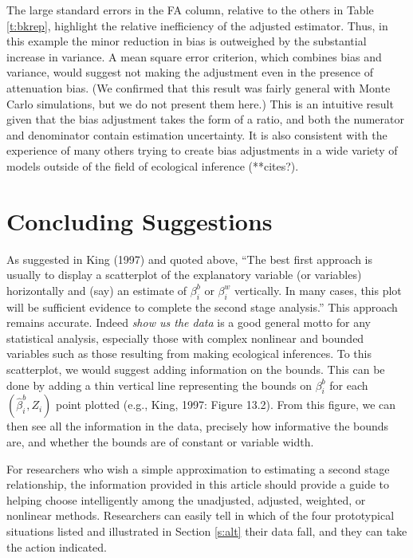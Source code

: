 \documentclass[11pt,titlepage]{article}
\begin{document}
The large standard errors in the FA column, relative to the others in
Table \ref{t:bkrep}, highlight the relative inefficiency of the
adjusted estimator.  Thus, in this example the minor reduction in bias
is outweighed by the substantial increase in variance.  A mean square
error criterion, which combines bias and variance, would suggest not
making the adjustment even in the presence of attenuation bias.  (We
confirmed that this result was fairly general with Monte Carlo
simulations, but we do not present them here.)  This is an intuitive
result given that the bias adjustment takes the form of a ratio, and
both the numerator and denominator contain estimation uncertainty.  It
is also consistent with the experience of many others trying to create
bias adjustments in a wide variety of models outside of the field of
ecological inference (**cites?).

\section{Concluding Suggestions}

As suggested in King (1997) and quoted above, ``The best first
approach is usually to display a scatterplot of the explanatory
variable (or variables) horizontally and (say) an estimate of
$\beta_i^b$ or $\beta_i^w$ vertically.  In many cases, this plot will
be sufficient evidence to complete the second stage analysis.''  This
approach remains accurate.  Indeed \emph{show us the data} is a good
general motto for any statistical analysis, especially those with
complex nonlinear and bounded variables such as those resulting from
making ecological inferences.  To this scatterplot, we would suggest
adding information on the bounds.  This can be done by adding a thin
vertical line representing the bounds on $\beta_i^b$ for each
$(\hat\beta_i^b,Z_i)$ point plotted (e.g., King, 1997: Figure 13.2).
From this figure, we can then see all the information in the data,
precisely how informative the bounds are, and whether the bounds are
of constant or variable width.

For researchers who wish a simple approximation to estimating a second
stage relationship, the information provided in this article should
provide a guide to helping choose intelligently among the unadjusted,
adjusted, weighted, or nonlinear methods.  Researchers can easily tell
in which of the four prototypical situations listed and illustrated in
Section \ref{s:alt} their data fall, and they can take the action
indicated.
\end{document}
